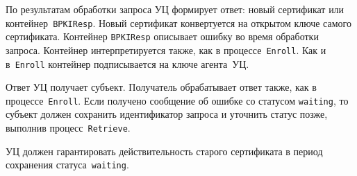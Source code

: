 По результатам обработки запроса УЦ формирует ответ: новый сертификат или 
контейнер~\texttt{BPKIResp}. Новый сертификат конвертуется на открытом 
ключе самого сертификата. Контейнер \texttt{BPKIResp} описывает ошибку во 
время обработки запроса. Контейнер интерпретируется также, как в 
процессе~\texttt{Enroll}. Как и в~\texttt{Enroll} контейнер подписывается 
на ключе агента~УЦ.

Ответ УЦ получает субъект. Получатель обрабатывает ответ также, 
как в процессе~\texttt{Enroll}. 
%
Если получено сообщение об ошибке со статусом
\texttt{waiting}, то субъект должен сохранить идентификатор запроса
и уточнить статус позже, выполнив процесс~\texttt{Retrieve}.

УЦ должен гарантировать действительность старого сертификата
в период сохранения статуса~\texttt{waiting}.

